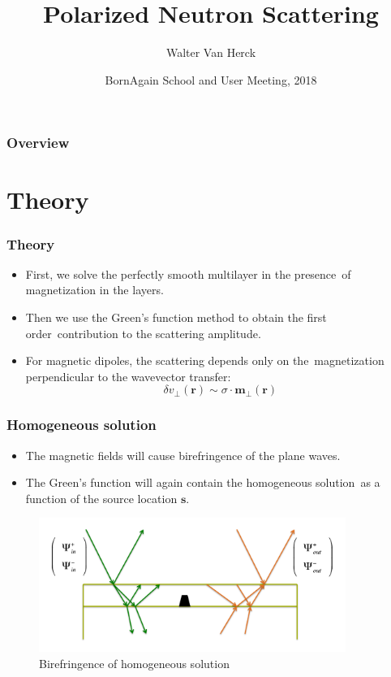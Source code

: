 \documentclass{beamer}
\title
{Polarized Neutron Scattering}
\author
{Walter Van Herck\inst{1}}
\institute[JCNS at MLZ] %
{
  \inst{1}%
  J\"ulich Centre for Neutron Science at MLZ
}
\date[BornAgain] %
{BornAgain School and User Meeting, 2018}
\begin{document}
\frame[plain]{\titlepage}

\begin{frame}
    \frametitle{Overview}
    \tableofcontents
\end{frame}

\section{Theory}

\begin{frame}
    \frametitle{Theory}
    \begin{itemize}
        \item First, we solve the perfectly smooth multilayer in the presence\
              of magnetization in the layers.
        \item Then we use the Green's function method to obtain the first order\
              contribution to the scattering amplitude.
        \item For magnetic dipoles, the scattering depends only on the\
              magnetization perpendicular to the wavevector transfer:
        \[ \delta v_\perp(\mathbf r) \sim \sigma \cdot \mathbf{m_\perp}(\mathbf r)\]
    \end{itemize}
\end{frame}

\begin{frame}
    \frametitle{Homogeneous solution}
    \begin{itemize}
        \item The magnetic fields will cause birefringence of the plane waves.
        \item The Green's function will again contain the homogeneous solution\
              as a function of the source location $\mathbf s$.
    \end{itemize}
    \begin{figure}
        \includegraphics[width=10cm]{birefringence.png}
        \\ Birefringence of homogeneous solution
    \end{figure}
\end{frame}
\end{document}
